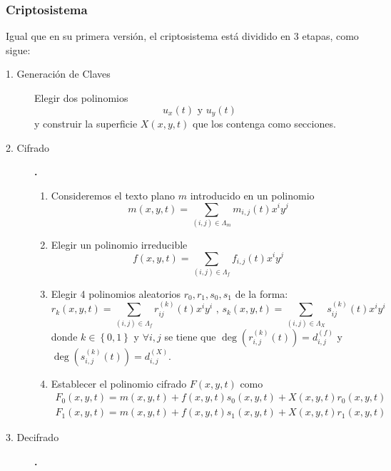 \documentclass[11pt]{article}
\newcommand{\izq}{\left\{ }
\newcommand{\der}{\right\} }
\numberwithin{equation}{section} %
\numberwithin{figure}{section} %
\numberwithin{table}{section} %
\begin{document}
			\subsubsection{Criptosistema}
			\label{412DesCVAFin}
				Igual que en su primera versi\'on, el criptosistema est\'a dividido en 3 etapas, como sigue:

					\begin{description}%
						\item[1. Generaci\'on de Claves] Elegir dos polinomios%
							$$
								u_x(t)\text{ y } u_y(t)
							$$
							y construir la superficie $X(x,y,t)$ que los contenga como secciones.
						\item[2. Cifrado]\textbf{.}%
						\begin{enumerate}%
							\item Consideremos el texto plano $m$ introducido en un polinomio%
								$$
									m(x,y,t)=\sum_{(i,j)\in\Lambda_m} m_{i,j}(t)x^iy^j
								$$
							\item Elegir un polinomio irreducible%
								$$
									f(x,y,t)=\sum_{(i,j)\in\Lambda_f} f_{i,j}(t)x^iy^j
								$$
							\item Elegir 4 polinomios aleatorios $r_0,r_1,s_0,s_1$ de la forma:%
								$$
									r_k(x,y,t)=\sum_{(i,j)\in\Lambda_f}r^{(k)}_{ij}(t)x^iy^i\text{ , }s_k(x,y,t)=\sum_{(i,j)\in\Lambda_X}s^{(k)}_{ij}(t)x^iy^i
								$$
								donde $k\in\izq 0,1\der$ y $\forall i,j$ se tiene que $\deg(r_{i,j}^{(k)}(t))=d^{(f)}_{i,j}$ y $\deg(s_{i,j}^{(k)}(t))=d^{(X)}_{i,j}$.
							\item Establecer el polinomio cifrado $F(x,y,t)$ como%
								\begin{eqnarray}
									F_0(x,y,t)=m(x,y,t)+f(x,y,t)s_0(x,y,t)+X(x,y,t)r_0(x,y,t)\label{Cif0}\\
									F_1(x,y,t)=m(x,y,t)+f(x,y,t)s_1(x,y,t)+X(x,y,t)r_1(x,y,t)\label{Cif1}
								\end{eqnarray}
						\end{enumerate}%
						\item[3. Decifrado]\textbf{.}%
						\begin{enumerate}%

\end{enumerate}
\end{description}
\end{document}
